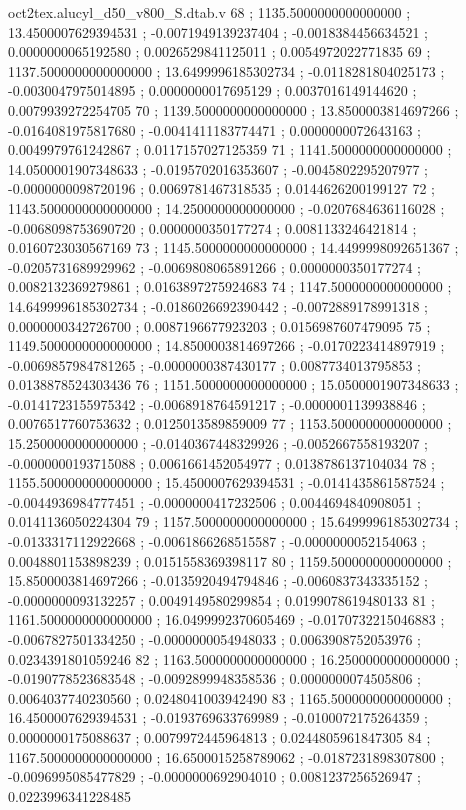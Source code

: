 \begin{filecontents}[overwrite]{oct2tex.alucyl_d50_v800_S.dtab.v}
68 ; 1135.5000000000000000 ; 13.4500007629394531 ; -0.0071949139237404 ; -0.0018384456634521 ; 0.0000000065192580 ; 0.0026529841125011 ; 0.0054972022771835
69 ; 1137.5000000000000000 ; 13.6499996185302734 ; -0.0118281804025173 ; -0.0030047975014895 ; 0.0000000017695129 ; 0.0037016149144620 ; 0.0079939272254705
70 ; 1139.5000000000000000 ; 13.8500003814697266 ; -0.0164081975817680 ; -0.0041411183774471 ; 0.0000000072643163 ; 0.0049979761242867 ; 0.0117157027125359
71 ; 1141.5000000000000000 ; 14.0500001907348633 ; -0.0195702016353607 ; -0.0045802295207977 ; -0.0000000098720196 ; 0.0069781467318535 ; 0.0144626200199127
72 ; 1143.5000000000000000 ; 14.2500000000000000 ; -0.0207684636116028 ; -0.0068098753690720 ; 0.0000000350177274 ; 0.0081133246421814 ; 0.0160723030567169
73 ; 1145.5000000000000000 ; 14.4499998092651367 ; -0.0205731689929962 ; -0.0069808065891266 ; 0.0000000350177274 ; 0.0082132369279861 ; 0.0163897275924683
74 ; 1147.5000000000000000 ; 14.6499996185302734 ; -0.0186026692390442 ; -0.0072889178991318 ; 0.0000000342726700 ; 0.0087196677923203 ; 0.0156987607479095
75 ; 1149.5000000000000000 ; 14.8500003814697266 ; -0.0170223414897919 ; -0.0069857984781265 ; -0.0000000387430177 ; 0.0087734013795853 ; 0.0138878524303436
76 ; 1151.5000000000000000 ; 15.0500001907348633 ; -0.0141723155975342 ; -0.0068918764591217 ; -0.0000001139938846 ; 0.0076517760753632 ; 0.0125013589859009
77 ; 1153.5000000000000000 ; 15.2500000000000000 ; -0.0140367448329926 ; -0.0052667558193207 ; -0.0000000193715088 ; 0.0061661452054977 ; 0.0138786137104034
78 ; 1155.5000000000000000 ; 15.4500007629394531 ; -0.0141435861587524 ; -0.0044936984777451 ; -0.0000000417232506 ; 0.0044694840908051 ; 0.0141136050224304
79 ; 1157.5000000000000000 ; 15.6499996185302734 ; -0.0133317112922668 ; -0.0061866268515587 ; -0.0000000052154063 ; 0.0048801153898239 ; 0.0151558369398117
80 ; 1159.5000000000000000 ; 15.8500003814697266 ; -0.0135920494794846 ; -0.0060837343335152 ; -0.0000000093132257 ; 0.0049149580299854 ; 0.0199078619480133
81 ; 1161.5000000000000000 ; 16.0499992370605469 ; -0.0170732215046883 ; -0.0067827501334250 ; -0.0000000054948033 ; 0.0063908752053976 ; 0.0234391801059246
82 ; 1163.5000000000000000 ; 16.2500000000000000 ; -0.0190778523683548 ; -0.0092899948358536 ; 0.0000000074505806 ; 0.0064037740230560 ; 0.0248041003942490
83 ; 1165.5000000000000000 ; 16.4500007629394531 ; -0.0193769633769989 ; -0.0100072175264359 ; 0.0000000175088637 ; 0.0079972445964813 ; 0.0244805961847305
84 ; 1167.5000000000000000 ; 16.6500015258789062 ; -0.0187231898307800 ; -0.0096995085477829 ; -0.0000000692904010 ; 0.0081237256526947 ; 0.0223996341228485

\end{filecontents}
